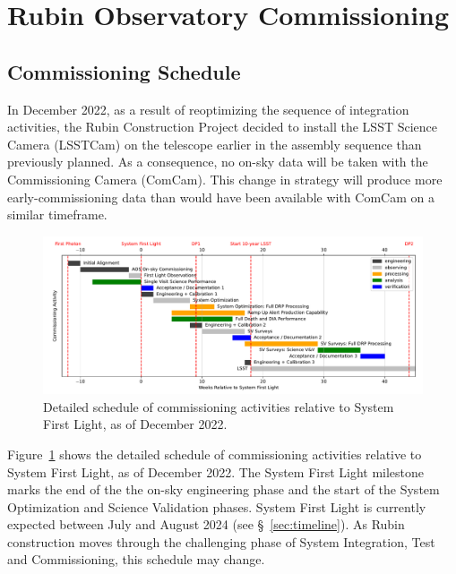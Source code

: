 \section{Rubin Observatory Commissioning}
\label{sec:commissioning}

\subsection{Commissioning Schedule}
\label{ssec:commissioning-schedule}

In December 2022, as a result of reoptimizing the sequence of integration activities, the Rubin Construction Project decided to install the LSST Science Camera (LSSTCam) on the telescope earlier in the assembly sequence than previously planned. 
As a consequence, no on-sky data will be taken with the Commissioning Camera (ComCam). 
This change in strategy will produce more early-commissioning data than would have been available with ComCam on a similar timeframe. 

\begin{figure}[htb]
\includegraphics[width=0.9\linewidth]{figures/rubinobs_on-sky_commissioning_gantt.pdf}
\caption{Detailed schedule of commissioning activities relative to System First Light, as of December 2022.}
\label{fig:commissioning-gantt}
\end{figure}

Figure~\ref{fig:commissioning-gantt} shows the detailed schedule of commissioning activities relative to System First Light, as of December 2022.  
The System First Light milestone marks the end of the the on-sky engineering phase and the start of the System Optimization and Science Validation phases. 
System First Light is currently expected between July and August 2024 (see \S~\ref{sec:timeline}).
As Rubin construction moves through the challenging phase of System Integration, Test and Commissioning, this schedule may change.


